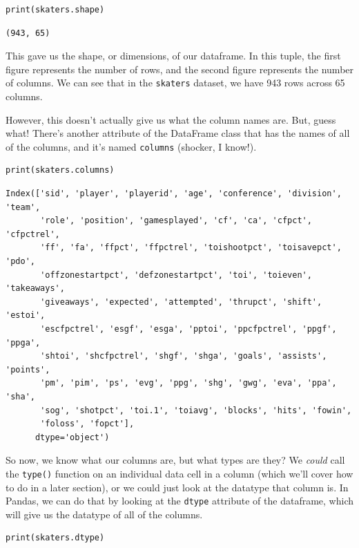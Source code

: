 \begin{lstlisting}[style=pippython]
print(skaters.shape)
\end{lstlisting}
\begin{lstlisting}[style=none]
(943, 65)
\end{lstlisting}
This gave us the shape, or dimensions, of our dataframe. In this tuple, the first figure represents the number of rows, and the second figure represents the number of columns. We can see that in the \verb|skaters| dataset, we have 943 rows across 65 columns.\par
However, this doesn't actually give us what the column names are. But, guess what! There's another attribute of the DataFrame class that has the names of all of the columns, and it's named \verb|columns| (shocker, I know!).
\begin{lstlisting}[style=pippython]
print(skaters.columns)
\end{lstlisting}
\begin{lstlisting}[style=none]
Index(['sid', 'player', 'playerid', 'age', 'conference', 'division', 'team',
       'role', 'position', 'gamesplayed', 'cf', 'ca', 'cfpct', 'cfpctrel',
       'ff', 'fa', 'ffpct', 'ffpctrel', 'toishootpct', 'toisavepct', 'pdo',
       'offzonestartpct', 'defzonestartpct', 'toi', 'toieven', 'takeaways',
       'giveaways', 'expected', 'attempted', 'thrupct', 'shift', 'estoi',
       'escfpctrel', 'esgf', 'esga', 'pptoi', 'ppcfpctrel', 'ppgf', 'ppga',
       'shtoi', 'shcfpctrel', 'shgf', 'shga', 'goals', 'assists', 'points',
       'pm', 'pim', 'ps', 'evg', 'ppg', 'shg', 'gwg', 'eva', 'ppa', 'sha',
       'sog', 'shotpct', 'toi.1', 'toiavg', 'blocks', 'hits', 'fowin',
       'foloss', 'fopct'],
      dtype='object')
\end{lstlisting}
So now, we know what our columns are, but what types are they? We \textit{could} call the \verb|type()| function on an individual data cell in a column (which we'll cover how to do in a later section), or we could just look at the datatype that column is. In Pandas, we can do that by looking at the \verb|dtype| attribute of the dataframe, which will give us the datatype of all of the columns.
\begin{lstlisting}[style=pippython]
print(skaters.dtype)
\end{lstlisting}
